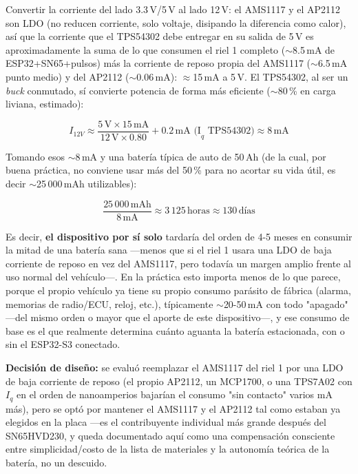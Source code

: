 Convertir la corriente del lado 3.3\,V/5\,V al lado 12\,V: el AMS1117 y el
AP2112 son LDO (no reducen corriente, solo voltaje, disipando la diferencia
como calor), así que la corriente que el TPS54302 debe entregar en su
salida de 5\,V es aproximadamente la suma de lo que consumen el riel 1
completo ($\sim$8.5\,mA de ESP32+SN65+pulsos) más la corriente de reposo
propia del AMS1117 ($\sim$6.5\,mA punto medio) y del AP2112
($\sim$0.06\,mA): $\approx$15\,mA a 5\,V. El TPS54302, al ser un
\textit{buck} conmutado, sí convierte potencia de forma más eficiente
($\sim$80\,\% en carga liviana, estimado):

\begin{equation}
I_{12V} \approx \frac{5\,\text{V} \times 15\,\text{mA}}{12\,\text{V} \times 0.80} + 0.2\,\text{mA (I}_q\text{ TPS54302)} \approx 8\,\text{mA}
\end{equation}

Tomando esos $\sim$8\,mA y una batería típica de auto de 50\,Ah (de la cual,
por buena práctica, no conviene usar más del 50\,\% para no acortar su vida
útil, es decir $\sim$25\,000\,mAh utilizables):

\begin{equation}
\frac{25\,000\,\text{mAh}}{8\,\text{mA}} \approx 3\,125\,\text{horas} \approx 130\,\text{días}
\end{equation}

Es decir, \textbf{el dispositivo por sí solo} tardaría del orden de 4-5
meses en consumir la mitad de una batería sana —menos que si el riel 1
usara una LDO de baja corriente de reposo en vez del AMS1117, pero todavía
un margen amplio frente al uso normal del vehículo—. En la práctica esto
importa menos de lo que parece, porque el propio vehículo ya tiene su
propio consumo parásito de fábrica (alarma, memorias de radio/ECU, reloj,
etc.), típicamente $\sim$20-50\,mA con todo "apagado" —del mismo orden o
mayor que el aporte de este dispositivo—, y ese consumo de base es el que
realmente determina cuánto aguanta la batería estacionada, con o sin el
ESP32-S3 conectado.

\textbf{Decisión de diseño:} se evaluó reemplazar el AMS1117 del riel 1 por
una LDO de baja corriente de reposo (el propio AP2112, un MCP1700, o una
TPS7A02 con $I_q$ en el orden de nanoamperios bajarían el consumo "sin
contacto" varios mA más), pero se optó por mantener el AMS1117 y el AP2112
tal como estaban ya elegidos en la placa —es el contribuyente individual
más grande después del SN65HVD230, y queda documentado aquí como una
compensación consciente entre simplicidad/costo de la lista de materiales y
la autonomía teórica de la batería, no un descuido.

